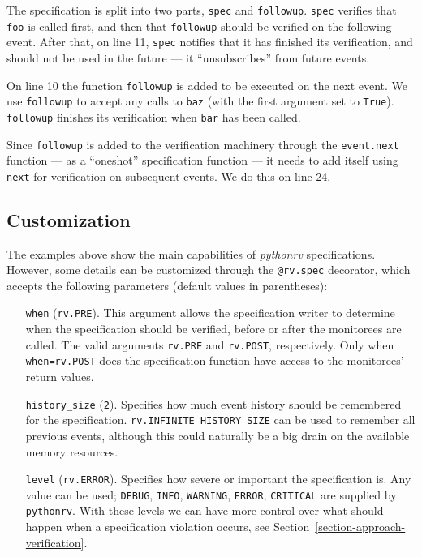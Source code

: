 \documentclass[a4paper,11pt]{kth-mag}
\theoremstyle{definition}
\begin{document}
The specification is split into two parts, \texttt{spec} and \texttt{followup}.
\texttt{spec} verifies that \texttt{foo} is called first, and then that
\texttt{followup} should be verified on the following event. After that, on
line 11, \texttt{spec} notifies that it has finished its verification, and
should not be used in the future --- it ``unsubscribes'' from future events.

On line 10 the function \texttt{followup} is added to be executed on the next
event. We use \texttt{followup} to accept any calls to \texttt{baz} (with the
first argument set to \texttt{True}). \texttt{followup} finishes its
verification when \texttt{bar} has been called.

Since \texttt{followup} is added to the verification machinery through the
\texttt{event.next} function --- as a ``oneshot'' specification function --- it
needs to add itself using \texttt{next} for verification on subsequent events.
We do this on line 24.



\subsection{Customization}

The examples above show the main capabilities of \textit{pythonrv}
specifications. However, some details can be customized through the
\texttt{@rv.spec} decorator, which accepts the following parameters (default
values in parentheses):

\begin{itemize}
  \item[\texttt{when}] (\texttt{rv.PRE}). This argument allows the
    specification writer to determine when the specification should be
    verified, before or after the monitorees are called. The valid arguments
    \texttt{rv.PRE} and \texttt{rv.POST}, respectively. Only when
    \texttt{when=rv.POST} does the specification function have access to the
    monitorees' return values.

  \item[\texttt{history\_size}] (\texttt{2}). Specifies how much event history
    should be remembered for the specification.
    \texttt{rv.INFINITE\_HISTORY\_SIZE} can be used to remember all previous
    events, although this could naturally be a big drain on the available
    memory resources.

  \item[\texttt{level}] (\texttt{rv.ERROR}). Specifies how severe or important
    the specification is. Any value can be used; \texttt{DEBUG}, \texttt{INFO},
    \texttt{WARNING}, \texttt{ERROR}, \texttt{CRITICAL} are supplied by
    \texttt{pythonrv}. With these levels we can have more control over what
    should happen when a specification violation occurs, see
    Section~\ref{section-approach-verification}.
\end{itemize}
\end{document}
